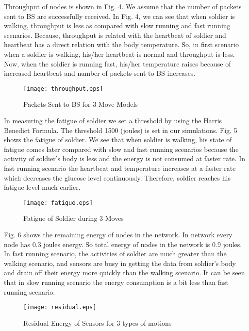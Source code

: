 \documentclass[journal]{IEEEtran}
\begin{document}
Throughput of nodes is shown in Fig. 4. We assume that the number of packets sent to BS are successfully received. In Fig. 4, we can see that when soldier is
walking, throughput is less as
 compared with slow running and fast running scenarios. Because, throughput is related with the heartbeat of soldier and heartbeat has a direct relation with
 the body temperature. So, in first scenario when a soldier is walking, his/her heartbeat is normal and throughput is less. Now, when the soldier is running fast,
 his/her temperature raises because of increased heartbeat and number of packets sent to BS increases.

 \begin{figure} [!ht]
 \centering
 \texttt{[image: throughput.eps]}
 \vspace{-1cm}
 \caption{Packets Sent to BS for 3 Move Models}
  \end{figure}

In measuring the fatigue of soldier we set a threshold by using the Harris Benedict Formula. The threshold 1500 (joules) is set in our simulations. Fig. 5
shows the fatigue of soldier. We see that when soldier is walking, his state of fatigue comes later compared with slow and fast running scenarios because the
 activity of soldier's body is less and the energy is not consumed at faster rate. In fast running scenario the heartbeat and temperature increases at a faster
 rate which decreases the glucose level continuously. Therefore, soldier reaches his fatigue level much earlier.

 \begin{figure} [!ht]
 \centering
 \texttt{[image: fatigue.eps]}
 \vspace{-1cm}
 \caption{Fatigue of Soldier during 3 Moves}
  \end{figure}

  Fig. 6 shows the remaining energy of nodes in the network. In network every node has $0.3$ joules energy. So total energy of nodes in the network is $0.9$ joules.
   In fast running scenario, the activities of soldier are much greater than the walking scenario, and sensors are busy in getting the data from soldier's body and
   drain off their energy more quickly than the walking scenario. It can be seen that in slow running scenario the energy consumption is a bit less than fast
   running scenario.
  \begin{figure} [!ht]
 \centering
 \texttt{[image: residual.eps]}
 \caption{Residual Energy of Sensors for 3 types of motions}
  \end{figure}
\end{document}
